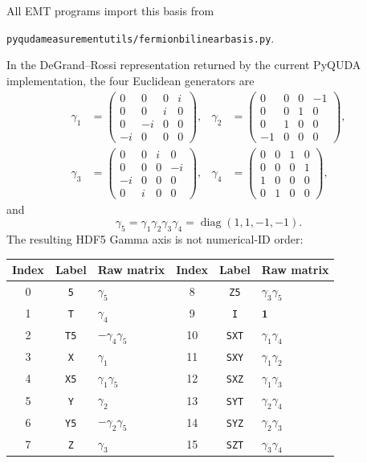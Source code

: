 \documentclass[11pt,a4paper]{article}
\newcommand{\code}[1]{\texttt{\begingroup\def\_{\textunderscore\allowbreak}#1\endgroup}}
\begin{document}
All EMT programs import this basis from
\begin{center}
\code{pyquda\_measurement\_utils/fermion\_bilinear\_basis.py}.
\end{center}
In the
DeGrand--Rossi representation returned by the current PyQUDA implementation,
the four Euclidean generators are
\begin{align}
\gamma_1&=\begin{pmatrix}0&0&0&i\\0&0&i&0\\0&-i&0&0\\-i&0&0&0\end{pmatrix},&
\gamma_2&=\begin{pmatrix}0&0&0&-1\\0&0&1&0\\0&1&0&0\\-1&0&0&0\end{pmatrix},\\
\gamma_3&=\begin{pmatrix}0&0&i&0\\0&0&0&-i\\-i&0&0&0\\0&i&0&0\end{pmatrix},&
\gamma_4&=\begin{pmatrix}0&0&1&0\\0&0&0&1\\1&0&0&0\\0&1&0&0\end{pmatrix},
\end{align}
and
\begin{equation}
\gamma_5=\gamma_1\gamma_2\gamma_3\gamma_4
=\operatorname{diag}(1,1,-1,-1).
\end{equation}
The resulting HDF5 Gamma axis is not numerical-ID order:
\begin{center}
\small
\begin{tabular}{ccl@{\qquad}ccl}
\toprule
Index & Label & Raw matrix & Index & Label & Raw matrix \\
\midrule
0 & \code{5}   & $\gamma_5$                 & 8  & \code{Z5}  & $\gamma_3\gamma_5$ \\
1 & \code{T}   & $\gamma_4$                 & 9  & \code{I}   & $\mathbf 1$ \\
2 & \code{T5}  & $-\gamma_4\gamma_5$        & 10 & \code{SXT} & $\gamma_1\gamma_4$ \\
3 & \code{X}   & $\gamma_1$                 & 11 & \code{SXY} & $\gamma_1\gamma_2$ \\
4 & \code{X5}  & $\gamma_1\gamma_5$         & 12 & \code{SXZ} & $\gamma_1\gamma_3$ \\
5 & \code{Y}   & $\gamma_2$                 & 13 & \code{SYT} & $\gamma_2\gamma_4$ \\
6 & \code{Y5}  & $-\gamma_2\gamma_5$        & 14 & \code{SYZ} & $\gamma_2\gamma_3$ \\
7 & \code{Z}   & $\gamma_3$                 & 15 & \code{SZT} & $\gamma_3\gamma_4$ \\
\bottomrule
\end{tabular}
\end{center}
\end{document}
